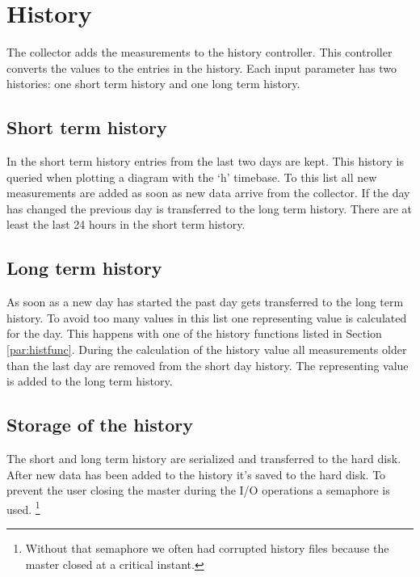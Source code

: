 {\C  }


\section{History} %
\label{sec:history}
The collector adds the measurements to the history controller. This controller converts the values to the entries in the history. Each input parameter has two histories: one short term history and one long term history. 
\subsection{Short term history} %
\label{sub:short_term_history}
In the short term history entries from the last two days are kept. This history is queried when plotting a diagram with the `h' timebase. To this list all new measurements are added as soon as new data arrive from the collector. If the day has changed the previous day is transferred to the long term history. There are at least the last 24 hours in the short term history.

\subsection{Long term history} %
\label{ssub:long_term_history}
As soon as a new day has started the past day gets transferred to the long term history. To avoid too many values in this list one representing value is calculated for the day. This happens with one of the history functions listed in Section \ref{par:histfunc}. During the calculation of the history value all measurements older than the last day are removed from the short day history. The representing value is added to the long term history.

\subsection{Storage of the history} %
\label{sub:storage_of_the_history}
The short and long term history are serialized and transferred to the hard disk. After new data has been added to the history it's saved to the hard disk. To prevent the user closing the master during the I/O operations a semaphore is used. \footnote{Without that semaphore we often had corrupted history files because the master closed at a critical instant.}

